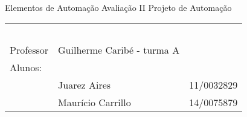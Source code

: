 \documentclass[a4paper,11pt]{article}
\begin{document}
\MakeMyTitlePage
{Elementos de Automação}
{Avaliação II}
{Projeto de Automação}
{%
		\begin{tabular}{llr} \
		& & \\[0.05cm]		
		Professor & Guilherme Caribé - turma A & \\
		 
		Alunos:& & \\
	&	 Juarez Aires   			& 11/0032829\\ 
	&	 Maurício Carrillo   			& 14/0075879 \\
	[0.05cm]	
		\end{tabular}
}



\end{document}

